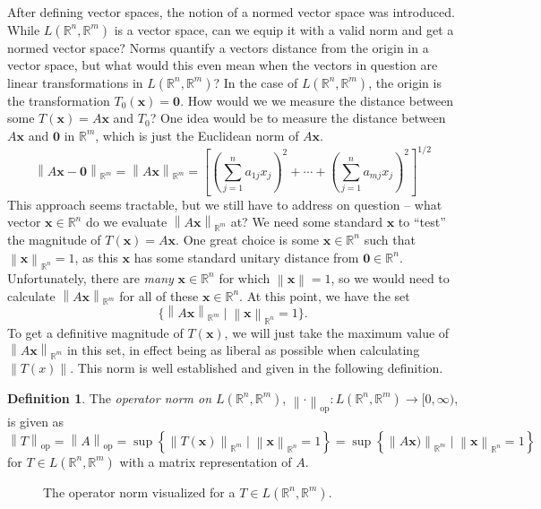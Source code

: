 \documentclass{article}
\newcommand{\R}{\mathbb{R}}
\newcommand{\x}{\mathbf{x}}
\newcommand{\ze}{\mathbf{0}}
\newcommand{\norm}[1]{\left\lVert#1\right\rVert}
\theoremstyle{definition}
\newtheorem{definition}{Definition}[section]
\begin{document}
After defining vector spaces, the notion of a normed vector space was introduced. While $ L(\R^n,\R^m) $ is a vector space, can we equip it with a valid norm and get a normed vector space? Norms quantify a vectors distance from the origin in a vector space, but what would this even mean when the vectors in question are linear transformations in $ L(\R^n, \R^m) $? In the case of $ L(\R^n,\R^m) $, the origin is the transformation $ T_0(\x)=\ze $. How would we we measure the distance between some $ T(\x)=A\x $ and $ T_0 $? One idea would be to measure the distance between $ A\x $ and $ \ze $ in $ \R^m $, which is just the Euclidean norm of $ A\x $.
$$ \norm{A\x - \ze }_{\R^m}= \norm{A\x}_{\R^m} = \left[\left(\sum_{j=1}^{n}a_{1j}x_j\right)^2 + \cdots + \left(\sum_{j=1}^{n}a_{mj}x_j \right)^2\right]^{1/2}$$
This approach seems tractable, but we still have to address on question -- what vector $ \x\in\R^n $ do we evaluate $ \norm{A\x}_{\R^m} $ at? We need some standard $ \x $ to ``test'' the magnitude of $ T(\x)=A\x $. One great choice is some $ \x\in\R^n $ such that $ \norm{\x}_{\R^n} = 1 $, as this $ \x $ has some standard unitary distance from $ \ze \in \R^n $. Unfortunately, there are \textit{many} $ \x\in\R^n $ for which $ \norm{\x}=1 $, so we would need to calculate $ \norm{A\x}_{\R^m} $ for all of these $ \x\in\R^n $. At this point, we have the set $$ \{\norm{A\x}_{\R^m}\mid \norm{\x}_{\R^n} = 1\} .$$ To get a definitive magnitude of $ T(\x) $, we will just take the maximum value of $ \norm{A\x}_{\R^m} $ in this set, in effect being as liberal as possible when calculating $ \norm{T(x)} $. This norm is well established and given in the following definition.  
\begin{definition}
 The \textit{\color{red}operator norm on $ L(\R^n,\R^m) $}, $ \norm{\cdot}_\text{op}:L(\R^n,\R^m)\to [0,\infty) $, is given as 
 $$ \norm{T}_\text{op} = \norm{A}_\text{op}= \sup\left\{\norm{T(\x)}_{\R^m}\mid \norm{\x}_{\R^n} = 1\right\} = \sup\left\{\norm{A\x)}_{\R^m}\mid \norm{\x}_{\R^n} = 1\right\}$$
 for $ T\in L(\R^n,\R^m) $ with a matrix representation of $ A $. 
\end{definition}
\begin{figure}[h!]
	\centering
	\caption{The operator norm visualized for a $ T\in L(\R^n,\R^m) $.}
\end{figure}
\end{document}

